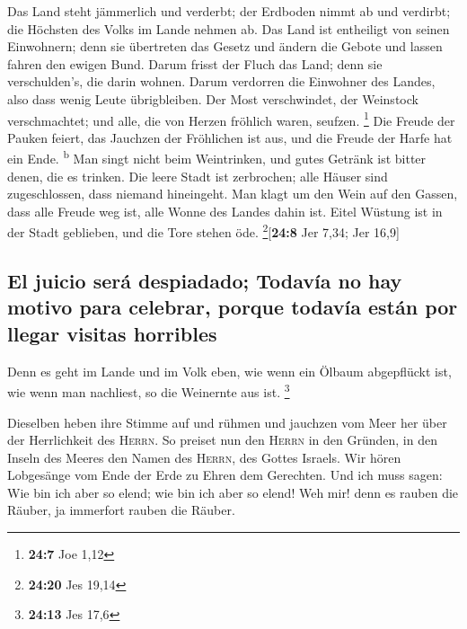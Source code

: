  Das Land steht jämmerlich und verderbt; der Erdboden
nimmt ab und verdirbt; die Höchsten des Volks im Lande nehmen ab.
 Das Land ist entheiligt von seinen Einwohnern; denn sie
übertreten das Gesetz und ändern die Gebote und lassen fahren den ewigen
Bund.  Darum frisst der Fluch das Land; denn sie
verschulden's, die darin wohnen. Darum verdorren die Einwohner des
Landes, also dass wenig Leute übrigbleiben.  Der Most
verschwindet, der Weinstock verschmachtet; und alle, die von Herzen
fröhlich waren, seufzen. \footnote{\textbf{24:7} Joe 1,12}
 Die Freude der Pauken feiert, das Jauchzen der Fröhlichen
ist aus, und die Freude der Harfe hat ein Ende. \textsuperscript{b}
 Man singt nicht beim Weintrinken, und gutes Getränk ist
bitter denen, die es trinken.  Die leere Stadt ist
zerbrochen; alle Häuser sind zugeschlossen, dass niemand hineingeht.
 Man klagt um den Wein auf den Gassen, dass alle Freude
weg ist, alle Wonne des Landes dahin ist.  Eitel Wüstung
ist in der Stadt geblieben, und die Tore stehen öde.
\footnote{\textbf{24:20} Jes 19,14}{[}\textbf{24:8} Jer 7,34; Jer
16,9{]}

\hypertarget{el-juicio-seruxe1-despiadado-todavuxeda-no-hay-motivo-para-celebrar-porque-todavuxeda-estuxe1n-por-llegar-visitas-horribles}{%
\subsection{El juicio será despiadado; Todavía no hay motivo para
celebrar, porque todavía están por llegar visitas
horribles}\label{el-juicio-seruxe1-despiadado-todavuxeda-no-hay-motivo-para-celebrar-porque-todavuxeda-estuxe1n-por-llegar-visitas-horribles}}

 Denn es geht im Lande und im Volk eben, wie wenn ein
Ölbaum abgepflückt ist, wie wenn man nachliest, so die Weinernte aus
ist. \footnote{\textbf{24:13} Jes 17,6}

 Dieselben heben ihre Stimme auf und rühmen und jauchzen
vom Meer her über der Herrlichkeit des \textsc{Herrn}. 
So preiset nun den \textsc{Herrn} in den Gründen, in den Inseln des
Meeres den Namen des \textsc{Herrn}, des Gottes Israels. 
Wir hören Lobgesänge vom Ende der Erde zu Ehren dem Gerechten. Und ich
muss sagen: Wie bin ich aber so elend; wie bin ich aber so elend! Weh
mir! denn es rauben die Räuber, ja immerfort rauben die Räuber.

